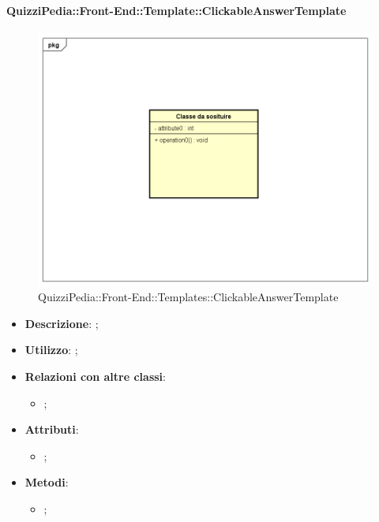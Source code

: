 		\paragraph{QuizziPedia::Front-End::Template::ClickableAnswerTemplate}
		
				\label{QuizziPedia::Front-End::Templates::ClickableAnswerTemplate}

				\begin{figure}[h]
					\centering
					\includegraphics[scale=0.5,keepaspectratio]{UML/Classi/Front-End/Temporanea.png}
					\caption{QuizziPedia::Front-End::Templates::ClickableAnswerTemplate}
				\end{figure}
		
			\begin{itemize}
				\item \textbf{Descrizione}: ;
				\item \textbf{Utilizzo}: ;
				\item \textbf{Relazioni con altre classi}: 
				\begin{itemize}
					\item ;
				\end{itemize}
				\item \textbf{Attributi}: 
				\begin{itemize}
					\item ;
				\end{itemize}
				\item \textbf{Metodi}: 
				\begin{itemize}
					\item ;
				\end{itemize}
			\end{itemize}
			
